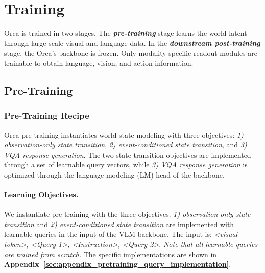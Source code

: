 
\section{Training}\label{sec:training}

Orca is trained in two stages. The \textbf{\textit{pre-training}} stage learns the world latent through large-scale visual and language data. In the \textbf{\textit{downstream post-training}} stage, the Orca's backbone is frozen. Only modality-specific readout modules are trainable to obtain language, vision, and action information. 

\subsection{Pre-Training}\label{sec:pretraining}


\subsubsection{Pre-Training Recipe}
\label{sec:pretraining_recipe}

Orca pre-training instantiates world-state modeling with three objectives: \textit{1) observation-only state transition}, \textit{2) event-conditioned state transition}, and \textit{3) VQA response generation}. The two state-transition objectives are implemented through a set of learnable query vectors, while \textit{3) VQA response generation} is optimized through the language modeling (LM) head of the backbone. 



\paragraph{Learning Objectives.}
We instantiate pre-training with the three objectives. \textit{1) observation-only state transition} and \textit{2) event-conditioned state transition} are implemented with learnable queries in the input of the VLM backbone. The input is: \textit{<visual token>, <Query 1>, <Instruction>, <Query 2>}. \textit{Note that all learnable queries are trained from scratch.} The specific implementations are shown in \textbf{Appendix~\ref{sec:appendix_pretraining_query_implementation}}.

